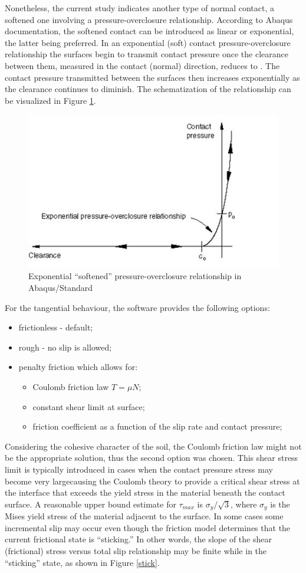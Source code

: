 \documentclass[10pt,a4paper]{report}
\begin{document}
Nonetheless, the current study indicates another type of normal contact, a softened one involving a pressure-overclosure relationship. According to Abaqus documentation, the softened contact can be introduced as linear or exponential, the latter being preferred. In an exponential (soft) contact pressure-overclosure relationship the surfaces begin to transmit contact pressure once the clearance between them, measured in the contact (normal) direction, reduces to . The contact pressure transmitted between the surfaces then increases exponentially as the clearance continues to diminish. The schematization of the relationship can be visualized in Figure \ref{pressure}.
\begin{figure}[!h]
	\centering
	\includegraphics[width=0.45 \linewidth]{"pressure"}
	\caption{Exponential “softened” pressure-overclosure relationship in Abaqus/Standard}
	\label{pressure}
\end{figure} 

For the tangential behaviour, the software provides the following options:
\begin{itemize}
	\item frictionless - default;
	\item rough - no slip is allowed;
	\item penalty friction which allows for:
		\begin{itemize}
			\item Coulomb friction law $T=\mu N$;
			\item constant shear limit at surface;
			\item friction coefficient as a function of the slip rate and contact pressure;
		\end{itemize}
\end{itemize}

Considering the cohesive character of the soil, the Coulomb friction law might not be the appropriate solution, thus the second option was chosen. This shear stress limit is typically introduced in cases when the contact pressure stress may become very largecausing the Coulomb theory to provide a critical shear stress at the interface that exceeds the yield stress in the material beneath the contact surface. A reasonable upper bound estimate for $\tau_{max}$ is $\sigma_y/\sqrt{3}$, where $\sigma_y$ is the Mises yield stress of the material adjacent to the surface. In some cases some incremental slip may occur even though the friction model determines that the current frictional state is “sticking.” In other words, the slope of the shear (frictional) stress versus total slip relationship may be finite while in the “sticking” state, as shown in Figure \ref*{stick}.
\end{document}

